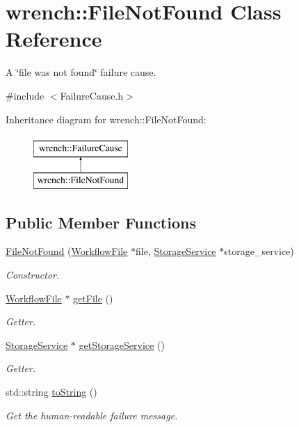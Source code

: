 \hypertarget{classwrench_1_1_file_not_found}{}\section{wrench\+:\+:File\+Not\+Found Class Reference}
\label{classwrench_1_1_file_not_found}


A \char`\"{}file was not found\char`\"{} failure cause.  




{\ttfamily \#include $<$Failure\+Cause.\+h$>$}

Inheritance diagram for wrench\+:\+:File\+Not\+Found\+:\begin{figure}[H]
\begin{center}
\leavevmode
\includegraphics[height=2.000000cm]{classwrench_1_1_file_not_found}
\end{center}
\end{figure}
\subsection*{Public Member Functions}
\begin{DoxyCompactItemize}
\item 
\hyperlink{classwrench_1_1_file_not_found_a7a9df85cd197ba69784965503c7610af}{File\+Not\+Found} (\hyperlink{classwrench_1_1_workflow_file}{Workflow\+File} $\ast$file, \hyperlink{classwrench_1_1_storage_service}{Storage\+Service} $\ast$storage\+\_\+service)
\begin{DoxyCompactList}\small\item\em Constructor. \end{DoxyCompactList}\item 
\hyperlink{classwrench_1_1_workflow_file}{Workflow\+File} $\ast$ \hyperlink{classwrench_1_1_file_not_found_aa89df5eaeb42af70876ac6ce084de33d}{get\+File} ()
\begin{DoxyCompactList}\small\item\em Getter. \end{DoxyCompactList}\item 
\hyperlink{classwrench_1_1_storage_service}{Storage\+Service} $\ast$ \hyperlink{classwrench_1_1_file_not_found_ac831b3a371f81e56bfac869fd4113514}{get\+Storage\+Service} ()
\begin{DoxyCompactList}\small\item\em Getter. \end{DoxyCompactList}\item 
std\+::string \hyperlink{classwrench_1_1_file_not_found_ac9c3bdcc58b4626a0f3de0b4288bf4b4}{to\+String} ()
\begin{DoxyCompactList}\small\item\em Get the human-\/readable failure message. \end{DoxyCompactList}\end{DoxyCompactItemize}

